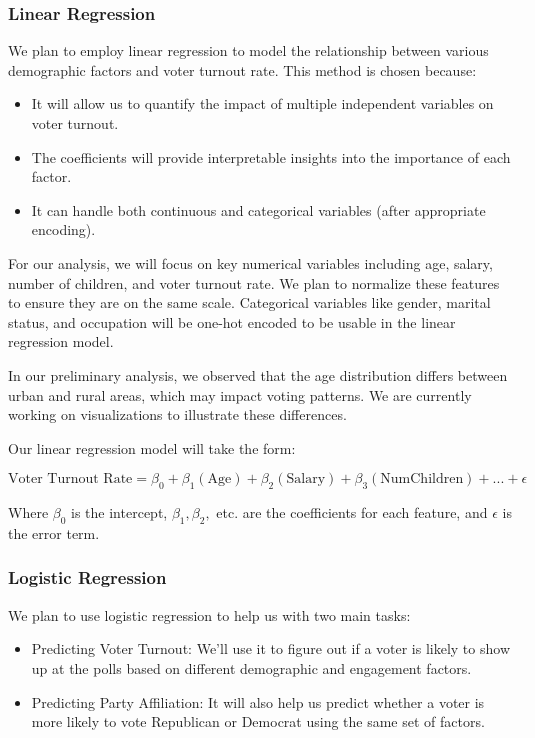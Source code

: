 \documentclass[conference]{IEEEtran}
\begin{document}
\subsubsection{Linear Regression}
We plan to employ linear regression to model the relationship between various demographic factors and voter turnout rate. This method is chosen because:

\begin{itemize}
    \item It will allow us to quantify the impact of multiple independent variables on voter turnout.
    \item The coefficients will provide interpretable insights into the importance of each factor.
    \item It can handle both continuous and categorical variables (after appropriate encoding).
\end{itemize}
For our analysis, we will focus on key numerical variables including age, salary, number of children, and voter turnout rate. We plan to normalize these features to ensure they are on the same scale. Categorical variables like gender, marital status, and occupation will be one-hot encoded to be usable in the linear regression model.

In our preliminary analysis, we observed that the age distribution differs between urban and rural areas, which may impact voting patterns. We are currently working on visualizations to illustrate these differences.


Our linear regression model will take the form:

\begin{equation}
\text{Voter Turnout Rate} = \beta_0 + \beta_1(\text{Age}) + \beta_2(\text{Salary}) + \beta_3(\text{NumChildren}) + ... + \epsilon
\end{equation}

Where $\beta_0$ is the intercept, $\beta_1, \beta_2,$ etc. are the coefficients for each feature, and $\epsilon$ is the error term.

\subsubsection{Logistic Regression}
We plan to use logistic regression to help us with two main tasks:

\begin{itemize}
    \item Predicting Voter Turnout: We’ll use it to figure out if a voter is likely to show up at the polls based on different demographic and engagement factors.
    \item Predicting Party Affiliation: It will also help us predict whether a voter is more likely to vote Republican or Democrat using the same set of factors.
\end{itemize}
\end{document}
